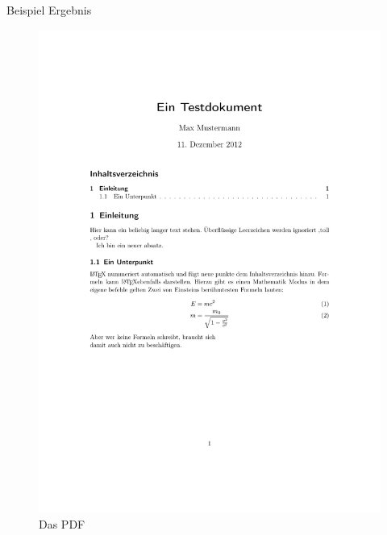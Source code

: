 \begin{frame}{Beispiel Ergebnis}
\begin{figure}[tbph]
\centering
\includegraphics[height=\textheight]{./pictures/demonstration}
\caption{Das PDF}

\label{fig:demonstration}
\end{figure}

\end{frame}
